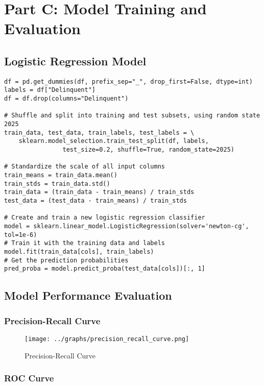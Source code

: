 \documentclass[12pt]{article}
\begin{document}
\section{Part C: Model Training and Evaluation}

\subsection{Logistic Regression Model}

\begin{verbatim}
df = pd.get_dummies(df, prefix_sep="_", drop_first=False, dtype=int)
labels = df["Delinquent"]
df = df.drop(columns="Delinquent")

# Shuffle and split into training and test subsets, using random state 2025
train_data, test_data, train_labels, test_labels = \
    sklearn.model_selection.train_test_split(df, labels,
                test_size=0.2, shuffle=True, random_state=2025)

# Standardize the scale of all input columns
train_means = train_data.mean()
train_stds = train_data.std()
train_data = (train_data - train_means) / train_stds
test_data = (test_data - train_means) / train_stds

# Create and train a new logistic regression classifier
model = sklearn.linear_model.LogisticRegression(solver='newton-cg', tol=1e-6)
# Train it with the training data and labels
model.fit(train_data[cols], train_labels)
# Get the prediction probabilities
pred_proba = model.predict_proba(test_data[cols])[:, 1]
\end{verbatim}

\subsection{Model Performance Evaluation}

\subsubsection{Precision-Recall Curve}

\begin{figure}[H]
    \centering
    \texttt{[image: ../graphs/precision\_recall\_curve.png]}
    \caption{Precision-Recall Curve}
    \label{fig:pr_curve}
\end{figure}

\subsubsection{ROC Curve}
\end{document}
